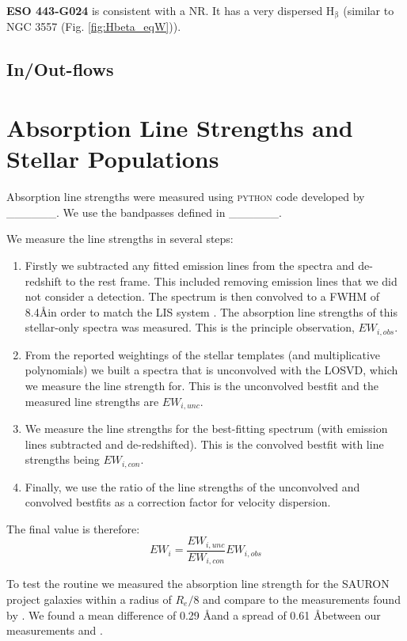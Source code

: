 \documentclass[fleqn,usenatbib,useAMS]{mnras}
\begin{document}
	\textbf{ESO 443-G024} is consistent with a NR. It has a very dispersed H$_\mathrm{\beta}$ (similar to NGC 3557 (Fig. \ref{fig:Hbeta_eqW})).

	\subsection{In/Out-flows}
		\label{subsec:inflows}


\section{Absorption Line Strengths and Stellar Populations}
	\label{sec:stellarPop}
	Absorption line strengths were measured using \textsc{python} code developed by \_\_\_\_\_\_. We use the bandpasses defined in \_\_\_\_\_\_. 

	We measure the line strengths in several steps:
	\begin{enumerate}
		\item Firstly we subtracted any fitted emission lines from the spectra and de-redshift to the rest frame. This included removing emission lines that we did not consider a detection. The spectrum is then convolved to a FWHM of 8.4\AA in order to match the LIS system \citep{Vazdekis2010}. The absorption line strengths of this stellar-only spectra was measured. This is the principle observation, $EW_{i,obs}$.
		\item From the reported weightings of the stellar templates (and multiplicative polynomials) we built a spectra that is unconvolved with the LOSVD, which we measure the line strength for. This is the unconvolved bestfit and the measured line strengths are $EW_{i,unc}$.
		\item We measure the line strengths for the best-fitting spectrum (with emission lines subtracted and de-redshifted). This is the convolved bestfit with line strengths being $EW_{i,con}$.
		\item Finally, we use the ratio of the line strengths of the unconvolved and convolved bestfits as a correction factor for velocity dispersion. 
	\end{enumerate}
	The final value is therefore:
	\begin{equation}
	EW_i = \frac{EW_{i, unc}}{EW_{i, con}} EW_{i, obs}
	\end{equation}

	To test the routine we measured the absorption line strength for the SAURON project \citep{Kuntschner2006} galaxies within a radius of $R_e/8$ and compare to the measurements found by \citet{Vazdekis2010}. We found a mean difference of 0.29 \AA and a spread of 0.61 \AA between our measurements and \citet{Vazdekis2010}.
\end{document}
